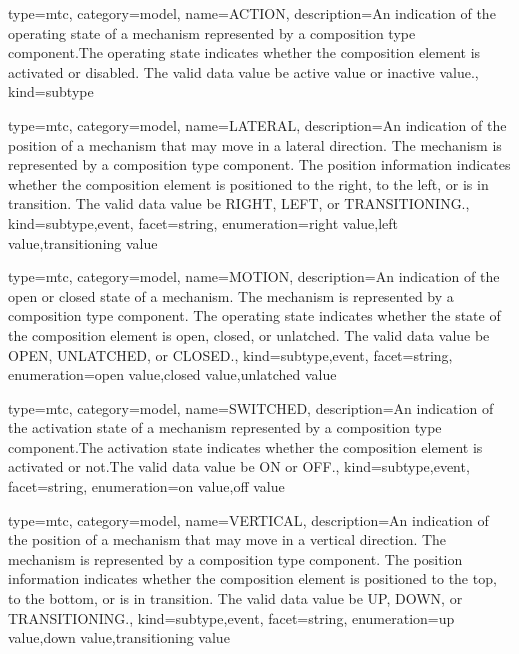 {
  type=mtc,
  category=model,
  name={ACTION},
  description={An indication of the operating state of a mechanism represented by a \gls{composition} type component.The operating state indicates whether the \gls{composition} element is activated or disabled. The \gls{valid data value} \must be \gls{active value} or \gls{inactive value}.},
  kind={subtype}
}


{
  type=mtc,
  category=model,
  name={LATERAL},
  description={An indication of the position of a mechanism that may move in a lateral direction.   The mechanism is represented by a \gls{composition} type component. \newline The position information indicates whether the \gls{composition} element is positioned to the right, to the left, or is in transition.  \newline The \gls{valid data value} \must be RIGHT, LEFT, or TRANSITIONING.},
  kind={subtype,event},
  facet={\gls{string}},
  enumeration={\gls{right value},\gls{left value},\gls{transitioning value}}
}


{
  type=mtc,
  category=model,
  name={MOTION},
  description={An indication of the open or closed state of a mechanism.   The mechanism is represented by a \gls{composition} type component. \newline The operating state indicates whether the state of the \gls{composition} element is open, closed, or unlatched.   \newline The \gls{valid data value} \must be OPEN, UNLATCHED, or CLOSED.},
  kind={subtype,event},
  facet={\gls{string}},
  enumeration={\gls{open value},\gls{closed value},\gls{unlatched value}}
}


{
  type=mtc,
  category=model,
  name={SWITCHED},
  description={An indication of the activation state of a mechanism represented by a \gls{composition} type component.The activation state indicates whether the \gls{composition} element is activated or not.The \gls{valid data value} \must be ON or OFF.},
  kind={subtype,event},
  facet={\gls{string}},
  enumeration={\gls{on value},\gls{off value}}
}


{
  type=mtc,
  category=model,
  name={VERTICAL},
  description={An indication of the position of a mechanism that may move in a vertical direction. The mechanism is represented by a \gls{composition} type component. \newline The position information indicates whether the \gls{composition} element is positioned to the top, to the bottom, or is in transition.  \newline The \gls{valid data value} \must be UP, DOWN, or TRANSITIONING.},
  kind={subtype,event},
  facet={\gls{string}},
  enumeration={\gls{up value},\gls{down value},\gls{transitioning value}}
}


